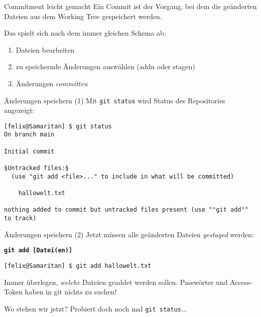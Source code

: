 \begin{frame}{Commitment leicht gemacht}
	Ein \alert{Commit} ist der Vorgang, bei dem die geänderten Dateien aus dem Working Tree gespeichert werden.

	Das spielt sich nach dem immer gleichen Schema ab:
	\begin{enumerate}
		\item Dateien bearbeiten
		\item zu speichernde Änderungen auswählen (\alert{add}n oder stagen)
		\item Änderungen \emph{\alert{commit}ten}
	\end{enumerate}
\end{frame}

\begin{frame}[fragile]{Änderungen speichern (1)}
	\centering Mit \alert{\texttt{git status}} wird Status des Repositories angezeigt:\\[.7cm]

	\begin{lstlisting}
[felix@Samaritan] $ git status
On branch main

Initial commit

§Untracked files:§
  (use "git add <file>..." to include in what will be committed)

    hallowelt.txt

nothing added to commit but untracked files present (use "°git add°" to track)
\end{lstlisting}
\end{frame}

\begin{frame}[fragile]{Änderungen speichern (2)}
	\centering Jetzt müssen alle geänderten Dateien \emph{gestaged} werden:

	\Large \textbf{\texttt{\alert{git add [Datei(en)]}}}\\[.7cm]

	\begin{lstlisting}
[felix@Samaritan] $ git add hallowelt.txt
\end{lstlisting}
	\normalsize
	\pause{}

	\begin{center} Immer überlegen, \emph{welche} Dateien geaddet werden sollen.
	Passwörter und Access-Token haben in git nichts zu suchen! \end{center}
\end{frame}

\begin{frame}{Wo stehen wir jetzt?}
	\centering Probiert doch noch mal \texttt{git status}...
\end{frame}

